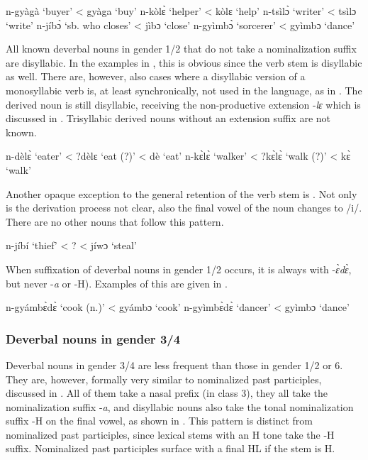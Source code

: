 \ea \label{BiN}
\ea  n-gyàgà `buyer' < gyàga `buy'
\ex n-kòlɛ̀ `helper'   < kòlɛ `help'
\ex n-tsìlɔ̀ `writer' < tsìlɔ `write' %
\ex n-jíbɔ̀ `sb. who closes' < jìbɔ `close'
\ex n-gyìmbɔ̀ `sorcerer'   < gyìmbɔ `dance'      
\z
\z

All known deverbal nouns in gender 1/2 that do not take a nominalization suffix are disyllabic. In the examples in , this is obvious since the verb stem is disyllabic as well. There are, however, also cases where a disyllabic version of a monosyllabic verb is, at least synchronically, not used in the language, as in . The derived noun is still disyllabic, receiving the non-productive extension -{\itshape lɛ} which is discussed in . Trisyllabic derived nouns without an extension suffix are not known.

\ea \label{Napp}
\ea   n-dèlɛ̀ `eater' < ?dèlɛ `eat (?)' < dè `eat'
\ex n-kɛ̀lɛ̀ `walker' < ?kɛ̀lɛ̀ `walk (?)' <    kɛ̀ `walk'
\z
\z

\noindent Another opaque exception to the general retention of the verb stem is . Not only is the derivation process not clear, also the final vowel of the noun changes to /i/. There are no other nouns that follow this pattern.

\ea \label{Napp2}
 n-jíbí `thief'  < ? <  jíwɔ `steal'  
\z


When suffixation of deverbal nouns in gender 1/2 occurs, it is always with -{\itshape ɛ̀dɛ̀}, but never -{\itshape a} or -H). Examples of this are given in .

\ea \label{ede}
\ea  n-gyámbɛ̀dɛ̀ `cook (n.)' < gyámbɔ `cook'
\ex n-gyìmbɛ̀dɛ̀ `dancer'     < gyìmbɔ `dance'       
\z
\z




\subsubsection{Deverbal nouns in gender 3/4}
\label{sec:NOM34}

Deverbal nouns in gender 3/4 are less frequent than those in gender 1/2 or 6. They are, however, formally very similar to nominalized past participles, discussed in . All of them take a nasal prefix (in class 3), they all take the nominalization suffix -{\itshape a}, and disyllabic nouns also take the tonal nominalization suffix -H on the final vowel, as shown in . This pattern is distinct from nominalized past participles, since lexical stems with an H tone take the -H suffix. Nominalized past participles surface with a final HL if the stem is H. 

